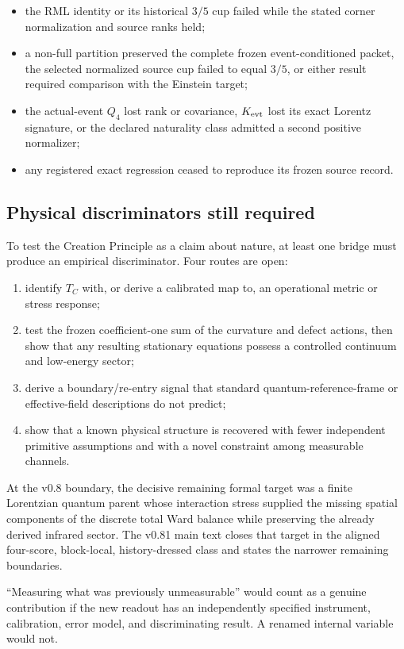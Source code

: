 \begin{itemize}
\item the RML identity or its historical $3/5$ cup failed while the stated corner normalization and source ranks held;
\item a non-full partition preserved the complete frozen event-conditioned packet, the selected normalized source cup failed to equal $3/5$, or either result required comparison with the Einstein target;
\item the actual-event $Q_4$ lost rank or covariance, $K_{\rm evt}$ lost its exact Lorentz signature, or the declared naturality class admitted a second positive normalizer;
\item any registered exact regression ceased to reproduce its frozen source record.
\end{itemize}

\subsection{Physical discriminators still required}

To test the Creation Principle as a claim about nature, at least one bridge must produce an empirical discriminator. Four routes are open:
\begin{enumerate}
\item identify $T_C$ with, or derive a calibrated map to, an operational metric or stress response;
\item test the frozen coefficient-one sum of the curvature and defect actions, then show that any resulting stationary equations possess a controlled continuum and low-energy sector;
\item derive a boundary/re-entry signal that standard quantum-reference-frame or effective-field descriptions do not predict;
\item show that a known physical structure is recovered with fewer independent primitive assumptions and with a novel constraint among measurable channels.
\end{enumerate}

At the v0.8 boundary, the decisive remaining formal target was a finite Lorentzian quantum parent whose interaction stress supplied the missing spatial components of the discrete total Ward balance while preserving the already derived infrared sector. The v0.81 main text closes that target in the aligned four-score, block-local, history-dressed class and states the narrower remaining boundaries.

``Measuring what was previously unmeasurable'' would count as a genuine contribution if the new readout has an independently specified instrument, calibration, error model, and discriminating result. A renamed internal variable would not.

